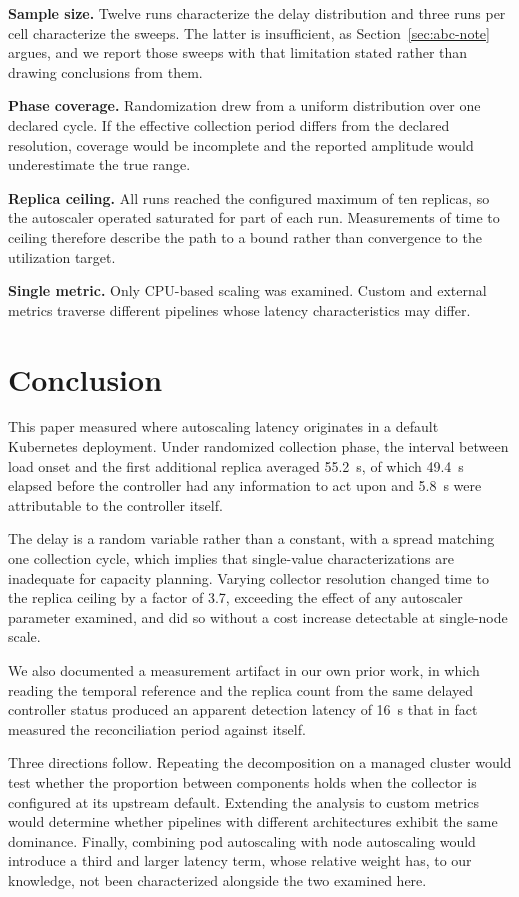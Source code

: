 \documentclass[conference]{IEEEtran}
\begin{document}
\textbf{Sample size.} Twelve runs characterize the delay distribution and three
runs per cell characterize the sweeps. The latter is insufficient, as
Section~\ref{sec:abc-note} argues, and we report those sweeps with that
limitation stated rather than drawing conclusions from them.

\textbf{Phase coverage.} Randomization drew from a uniform distribution over one
declared cycle. If the effective collection period differs from the declared
resolution, coverage would be incomplete and the reported amplitude would
underestimate the true range.

\textbf{Replica ceiling.} All runs reached the configured maximum of ten
replicas, so the autoscaler operated saturated for part of each run. Measurements
of time to ceiling therefore describe the path to a bound rather than
convergence to the utilization target.

\textbf{Single metric.} Only CPU-based scaling was examined. Custom and external
metrics traverse different pipelines whose latency characteristics may differ.

\label{sec:abc-note}

\section{Conclusion}

This paper measured where autoscaling latency originates in a default Kubernetes
deployment. Under randomized collection phase, the interval between load onset
and the first additional replica averaged 55.2~s, of which 49.4~s elapsed before
the controller had any information to act upon and 5.8~s were attributable to
the controller itself.

The delay is a random variable rather than a constant, with a spread matching
one collection cycle, which implies that single-value characterizations are
inadequate for capacity planning. Varying collector resolution changed time to
the replica ceiling by a factor of 3.7, exceeding the effect of any autoscaler
parameter examined, and did so without a cost increase detectable at
single-node scale.

We also documented a measurement artifact in our own prior work, in which
reading the temporal reference and the replica count from the same delayed
controller status produced an apparent detection latency of 16~s that in fact
measured the reconciliation period against itself.

Three directions follow. Repeating the decomposition on a managed cluster would
test whether the proportion between components holds when the collector is
configured at its upstream default. Extending the analysis to custom metrics
would determine whether pipelines with different architectures exhibit the same
dominance. Finally, combining pod autoscaling with node autoscaling would
introduce a third and larger latency term, whose relative weight has, to our
knowledge, not been characterized alongside the two examined here.
\end{document}
